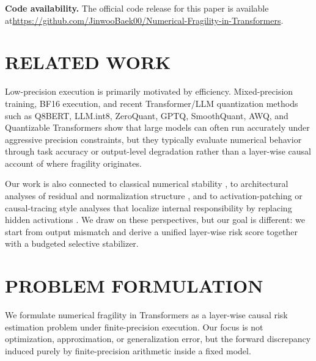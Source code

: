 \documentclass[twoside]{article}
\theoremstyle{definition}
\theoremstyle{remark}
\begin{document}
\noindent\textbf{Code availability.} The official code release for this paper is
available at\linebreak \url{https://github.com/JinwooBaek00/Numerical-Fragility-in-Transformers}.

\vspace{-0.5em}

\section{RELATED WORK}
\label{sec:related_work}

Low-precision execution is primarily motivated by efficiency. Mixed-precision
training, BF16 execution, and recent Transformer/LLM quantization methods such
as Q8BERT, LLM.int8, ZeroQuant, GPTQ, SmoothQuant, AWQ, and Quantizable
Transformers
\citep{Micikevicius2018mixedprecision,Kalamkar2019bfloat16,Zafrir2019q8bert,Dettmers2022llmint8,Yao2022zeroquant,Frantar2022gptq,Xiao2022smoothquant,Lin2024awq,Bondarenko2023quantizable}
show that large models can often run accurately under aggressive precision
constraints, but they typically evaluate numerical behavior through task
accuracy or output-level degradation rather than a layer-wise causal account of
where fragility originates.

Our work is also connected to classical numerical stability
\citep{Goldberg1991floatingpoint,Higham2002accuracy,IEEE754-2019}, to
architectural analyses of residual and normalization structure
\citep{He2016deepresidual,Ba2016layernorm,Xiong2020onlayernorm,Zhang2019rmsnorm},
and to activation-patching or causal-tracing style analyses that localize
internal responsibility by replacing hidden activations
\citep{Vig2020cma,Meng2022factassoc}. We draw on these perspectives, but our
goal is different: we start from output mismatch and derive a unified
layer-wise risk score together with a budgeted selective stabilizer.

\vspace{-0.5em}

\section{PROBLEM FORMULATION}
\label{sec:problem_formulation}

We formulate numerical fragility in Transformers as a layer-wise causal risk
estimation problem under finite-precision execution. Our focus is not
optimization, approximation, or generalization error, but the forward
discrepancy induced purely by finite-precision arithmetic inside a fixed model.
\end{document}
